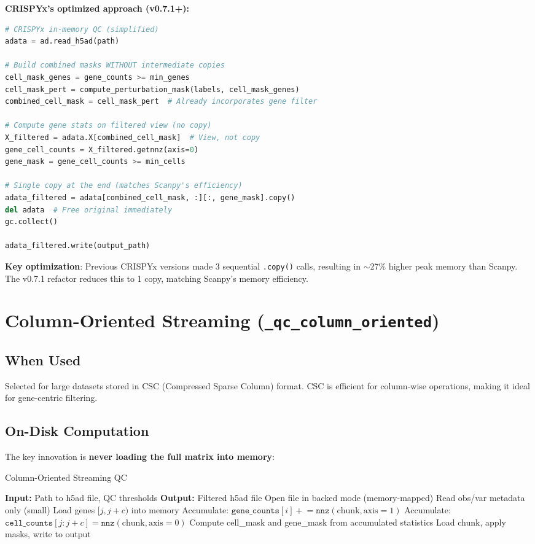 \documentclass{article}
\begin{document}
\textbf{CRISPYx's optimized approach (v0.7.1+):}
\begin{lstlisting}[language=Python]
# CRISPYx in-memory QC (simplified)
adata = ad.read_h5ad(path)

# Build combined masks WITHOUT intermediate copies
cell_mask_genes = gene_counts >= min_genes
cell_mask_pert = compute_perturbation_mask(labels, cell_mask_genes)
combined_cell_mask = cell_mask_pert  # Already incorporates gene filter

# Compute gene stats on filtered view (no copy)
X_filtered = adata.X[combined_cell_mask]  # View, not copy
gene_cell_counts = X_filtered.getnnz(axis=0)
gene_mask = gene_cell_counts >= min_cells

# Single copy at the end (matches Scanpy's efficiency)
adata_filtered = adata[combined_cell_mask, :][:, gene_mask].copy()
del adata  # Free original immediately
gc.collect()

adata_filtered.write(output_path)
\end{lstlisting}

\textbf{Key optimization}: Previous CRISPYx versions made 3 sequential \texttt{.copy()} 
calls, resulting in $\sim$27\% higher peak memory than Scanpy. The v0.7.1 refactor 
reduces this to 1 copy, matching Scanpy's memory efficiency.

\section{Column-Oriented Streaming (\texttt{\_qc\_column\_oriented})}

\subsection{When Used}
Selected for large datasets stored in CSC (Compressed Sparse Column) format. CSC is 
efficient for column-wise operations, making it ideal for gene-centric filtering.

\subsection{On-Disk Computation}

The key innovation is \textbf{never loading the full matrix into memory}:

\begin{algorithm}[H]
\caption{Column-Oriented Streaming QC}
\begin{algorithmic}[1]
\State \textbf{Input:} Path to h5ad file, QC thresholds
\State \textbf{Output:} Filtered h5ad file
\State
\State Open file in backed mode (memory-mapped)
\State Read obs/var metadata only (small)
    \State Load genes $[j, j+c)$ into memory
    \State Accumulate: $\texttt{gene\_counts}[i] \mathrel{+}= \texttt{nnz}(\text{chunk}, \text{axis}=1)$
    \State Accumulate: $\texttt{cell\_counts}[j:j+c] = \texttt{nnz}(\text{chunk}, \text{axis}=0)$
\EndFor
\State Compute cell\_mask and gene\_mask from accumulated statistics
\State
{} 
    \State Load chunk, apply masks, write to output
\EndFor
\end{algorithmic}
\end{algorithm}
\end{document}
